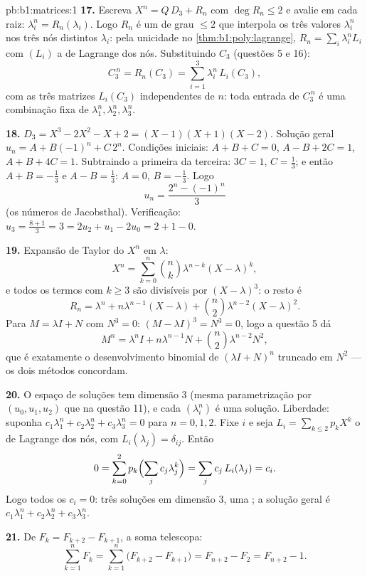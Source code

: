 \begin{solution}{pb:b1:matrices:1}
\textbf{17.} Escreva $X^n = Q\,D_3 + R_n$ com $\deg R_n \leq 2$ e avalie em cada raiz: $\lambda_i^n = R_n(\lambda_i)$.
Logo $R_n$ é um  de grau $\leq 2$ que interpola os três
valores $\lambda_i^n$ nos três nós distintos $\lambda_i$: pela unicidade no \cref{thm:b1:poly:lagrange},
$R_n = \sum_i
\lambda_i^n L_i$ com $(L_i)$ a  de Lagrange dos nós. Substituindo $C_3$
(questões 5 e 16):
\[
C_3^{\,n} = R_n(C_3) = \sum_{i=1}^{3} \lambda_i^n\,L_i(C_3),
\]
com as três matrizes $L_i(C_3)$ independentes de $n$: toda entrada de
$C_3^{\,n}$ é uma combinação fixa de $\lambda_1^n,
\lambda_2^n, \lambda_3^n$.

\textbf{18.} $D_3 = X^3 - 2X^2 - X + 2 = (X-1)(X+1)(X-2)$. Solução geral $u_n = A + B(-1)^n + C\,2^n$. Condições iniciais: $A + B + C = 0$,
$A - B + 2C = 1$, $A + B + 4C = 1$. Subtraindo a primeira da terceira: $3C = 1$, $C = \frac13$; e
então $A + B = -\frac13$ e $A - B = \frac13$: $A = 0$, $B =
-\frac13$. Logo
\[
u_n = \frac{2^n - (-1)^n}{3}
\]
(os números de Jacobsthal). Verificação: $u_3 = \frac{8 + 1}{3} = 3 =
2u_2 + u_1 - 2u_0 = 2 + 1 - 0$.

\textbf{19.} Expansão de Taylor do  $X^n$ em $\lambda$:
\[
X^n = \sum_{k=0}^{n} \binom nk \lambda^{n-k}(X - \lambda)^k ,
\]
e todos os termos com $k \geq 3$ são divisíveis por $(X -
\lambda)^3$: o resto é
\[
R_n = \lambda^n + n\lambda^{n-1}(X - \lambda) + \binom
n2\lambda^{n-2}(X - \lambda)^2 .
\]
Para $M = \lambda I + N$ com $N^3 = 0$: $(M - \lambda I)^3 = N^3
= 0$, logo a questão 5 dá
\[
M^n = \lambda^n I + n\lambda^{n-1} N + \binom n2
\lambda^{n-2} N^2 ,
\]
que é exatamente o desenvolvimento binomial de $(\lambda I + N)^n$ truncado em
$N^2$ --- os dois métodos concordam.

\textbf{20.} O espaço de soluções tem dimensão $3$ (mesma
parametrização por $(u_0, u_1, u_2)$ que na questão 11), e cada $(\lambda_i^n)$ é uma
solução. Liberdade: suponha $c_1\lambda_1^n + c_2\lambda_2^n + c_3\lambda_3^n = 0$ para $n =
0, 1, 2$. Fixe $i$ e seja $L_i = \sum_{k \leq 2} p_k X^k$
o  de Lagrange dos nós, com $L_i(\lambda_j) =
\delta_{ij}$. Então
\[
0 = \sum_{k=0}^{2} p_k\Bigl(\sum_j c_j\lambda_j^k\Bigr)
= \sum_j c_j\,L_i(\lambda_j) = c_i .
\]
Logo todos os $c_i = 0$: três soluções  em dimensão $3$, uma
; a solução geral é $c_1\lambda_1^n +
c_2\lambda_2^n + c_3\lambda_3^n$.

\textbf{21.} De $F_k = F_{k+2} - F_{k+1}$, a soma telescopa:
\[
\sum_{k=1}^{n} F_k = \sum_{k=1}^{n}\bigl(F_{k+2} - F_{k+1}\bigr)
= F_{n+2} - F_2 = F_{n+2} - 1 .
\]


\end{solution}
